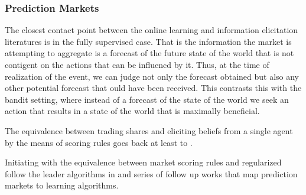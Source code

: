 \subsubsection{Prediction Markets} 

The closest contact point between the online learning and information elicitation literatures is in the fully supervised case.
That is the information the market is attempting to aggregate is a forecast of the future state of the world that is not contigent on the actions that can be influencd by it. Thus, at the time of realization of the event, we can judge not only the forecast obtained but also any other potential forecast that ould have been received. 
This contrasts this with the bandit setting, where instead of a forecast of the state of the world we seek an action that results in a state of the world that is maximally beneficial.  



The equivalence between trading shares and eliciting beliefs from a single agent by the means of scoring rules goes back at least to \cite{savage1971elicitation}. 





Initiating with the equivalence between market scoring rules and regularized follow the leader algorithms in \cite{chen2010new} and series of follow up works \cite{abernethy2013efficient, frongillo2012interpreting, hu2014multi, frongillo2015convergence,} that map prediction markets to learning algorithms. 

